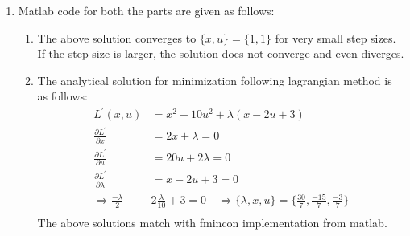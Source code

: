 \begin{enumerate}
\item 
   Matlab code for both the parts are given as follows:
  
  \begin{enumerate}
    \item  The above solution converges to $\{x,u\} = \{1,1\}$ for very small
step sizes. If the step size is larger, the solution does not converge and even
diverges.
  \item The analytical solution for minimization following lagrangian method is
as follows:
  \begin{align*}
   L^\prime(x,u) &= x^2 + 10 u^2 + \lambda (x-2u+3) \\
   \frac{\partial L^\prime}{\partial x} &= 2x + \lambda = 0\\
   \frac{\partial L^\prime}{\partial u} &= 20u + 2\lambda = 0\\
   \frac{\partial L^\prime}{\partial \lambda} &= x-2u+3 = 0\\
   \Rightarrow \frac{-\lambda}{2} -&2\frac{\lambda}{10} + 3 = 0\quad \Rightarrow
\{\lambda,x,u\} = \{\frac{30}{7}, \frac{-15}{7}, \frac{-3}{7}\}\\
  \end{align*}
  The above solutions match with fmincon implementation from matlab.
  \end{enumerate}


\end{enumerate}

